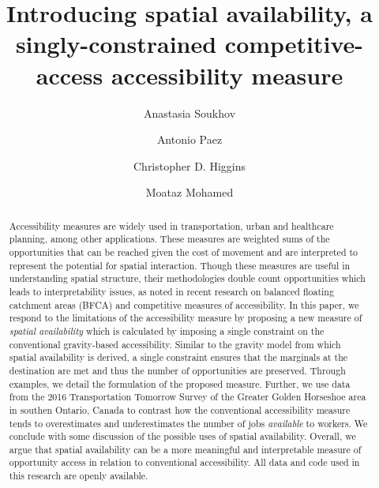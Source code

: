 \documentclass[]{elsarticle} %
\begin{document}
\begin{frontmatter}

  \title{Introducing spatial availability, a singly-constrained
competitive-access accessibility measure}
    \author[SEES]{Anastasia Soukhov}
    \author[SEES]{Antonio Paez}
    \author[UofTS]{Christopher D. Higgins}
    \author[CIVENG]{Moataz Mohamed}
      \address[SEES]{School of Earth, Environment and Society, McMaster
University, Hamilton, ON, L8S 4K1, Canada}
    \address[UofTS]{Department of Geography \& Planning, University of
Toronto Scarborough, 1265 Military Trail, Toronto, ON M1C1A4}
    \address[CIVENG]{Department of Civil Engineering, McMaster
University, Hamilton, ON, L8S 4K1, Canada}
  
  \begin{abstract}
  Accessibility measures are widely used in transportation, urban and
  healthcare planning, among other applications. These measures are
  weighted sums of the opportunities that can be reached given the cost
  of movement and are interpreted to represent the potential for spatial
  interaction. Though these measures are useful in understanding spatial
  structure, their methodologies double count opportunities which leads
  to interpretability issues, as noted in recent research on balanced
  floating catchment areas (BFCA) and competitive measures of
  accessibility. In this paper, we respond to the limitations of the
  accessibility measure by proposing a new measure of \emph{spatial
  availability} which is calculated by imposing a single constraint on
  the conventional gravity-based accessibility. Similar to the gravity
  model from which spatial availability is derived, a single constraint
  ensures that the marginals at the destination are met and thus the
  number of opportunities are preserved. Through examples, we detail the
  formulation of the proposed measure. Further, we use data from the
  2016 Transportation Tomorrow Survey of the Greater Golden Horseshoe
  area in southen Ontario, Canada to contrast how the conventional
  accessibility measure tends to overestimates and underestimates the
  number of jobs \emph{available} to workers. We conclude with some
  discussion of the possible uses of spatial availability. Overall, we
  argue that spatial availability can be a more meaningful and
  interpretable measure of opportunity access in relation to
  conventional accessibility. All data and code used in this research
  are openly available.
  \end{abstract}
  
 \end{frontmatter}
\end{document}
